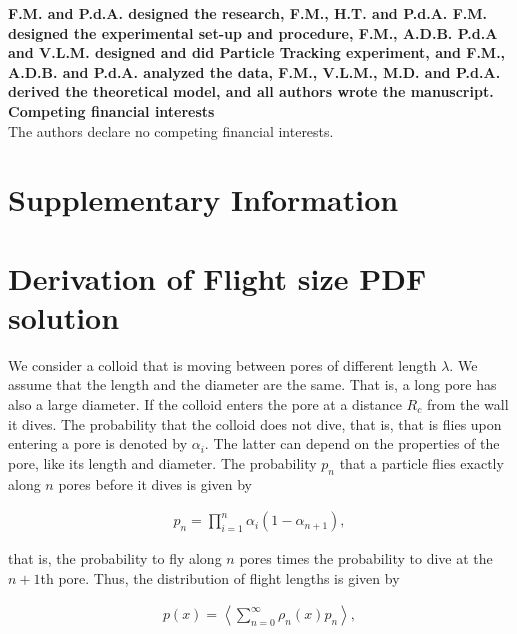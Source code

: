 \documentclass[singlecolumn,pre,notitlepage,preprintnumbers,floatfix,superscriptaddress]{revtex4-1}
\begin{document}
\noindent
\textbf{F.M. and P.d.A. designed the research, F.M., H.T. and P.d.A. F.M. designed the experimental set-up and procedure, F.M., A.D.B. P.d.A and V.L.M. designed and did Particle Tracking experiment, and F.M., A.D.B. and P.d.A. analyzed the data, F.M., V.L.M., M.D. and P.d.A. derived the theoretical model, and all authors wrote the manuscript.} \\

\noindent
\textbf{Competing financial interests}\\
The authors declare no competing financial interests.\\

\clearpage
\section*{Supplementary Information}

\setcounter{figure}{0}
\renewcommand{\thefigure}{S\arabic{figure}}

\setcounter{section}{0}
\renewcommand{\thesection}{S\arabic{section}}
\section{Derivation of Flight size PDF solution}

We consider a colloid that is moving between pores of different length $\lambda$. We assume that the length and the diameter are the same. That is, a long pore has also a large diameter. If the colloid enters the pore at a distance $R_c$ from the wall it dives. The probability that the colloid does not dive, that is, that is flies upon entering a pore is denoted by $\alpha_i$. The latter can depend on the properties of the pore, like its length and diameter. The probability $p_n$ that a particle flies exactly along $n$ pores before it dives is given by

\begin{align}
\label{eq:pn}
p_n = \prod\limits_{i = 1}^n \alpha_i (1 - \alpha_{n+1}),
\end{align}

that is, the probability to fly along $n$ pores times the probability to dive at the $n+1$th pore. Thus, the distribution of flight lengths is given by

\begin{align}
\label{eq:p}
p(x) = \left\langle \sum\limits_{n = 0}^\infty \rho_n(x) p_n \right\rangle,
\end{align}
\end{document}
